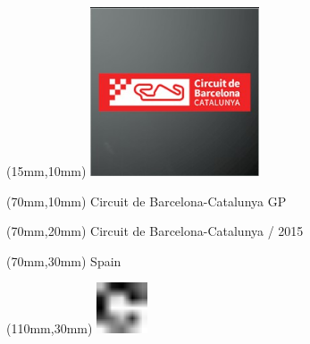 \null\newpage
\begin{textblock*}{50mm}(15mm,10mm)%
\includegraphics[width=50mm]{LG/2015-05-20_00078.png}
\end{textblock*}
\begin{textblock*}{130mm}(70mm,10mm)%
{\fontsize{20}{20}\selectfont Circuit de Barcelona-Catalunya GP}\\
\end{textblock*}
\begin{textblock*}{120mm}(70mm,20mm)%
{\fontsize{16}{16}\selectfont Circuit de Barcelona-Catalunya / 2015}\\
\end{textblock*}
\begin{textblock*}{120mm}(70mm,30mm)%
{\fontsize{12}{12}\selectfont Spain}
\end{textblock*}
\begin{textblock*}{30mm}(110mm,30mm)%
\centering
\includegraphics[height=15mm]{icons/fa-rotate-right.pdf}
\end{textblock*}
